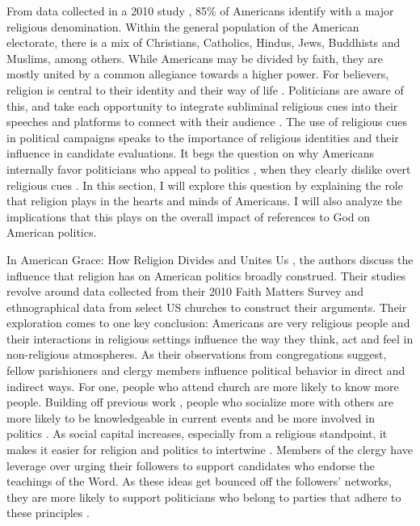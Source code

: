 \documentclass[letterpaper,man,natbib,noextraspace,12pt]{apa6}  %
\begin{document}
From data collected in a 2010 study \citep{putnam_american_2010}, 85\% of Americans identify with a major religious denomination. Within the general population of the American electorate, there is a mix of Christians, Catholics, Hindus, Jews, Buddhists and Muslims, among others. While Americans may be divided by faith, they are mostly united by a common allegiance towards a higher power. For believers, religion is central to their identity and their way of life \citep{wald_religion_2011}. Politicians are aware of this, and take each opportunity to integrate subliminal religious cues into their speeches and platforms to connect with their audience \citep{albertson_religious_2011, domke_god_2008}. The use of religious cues in political campaigns speaks to the importance of religious identities and their influence in candidate evaluations. It begs the question on why Americans internally favor politicians who appeal to politics \citep{albertson_religious_2011}, when they clearly dislike overt religious cues \citep{mclaughlin_cueing_2014}. In this section, I will explore this question by explaining the role that religion plays in the hearts and minds of Americans. I will also analyze the implications that this plays on the overall impact of references to God on American politics.

In American Grace: How Religion Divides and Unites Us \citep{putnam_american_2010}, the authors discuss the influence that religion has on American politics broadly construed. Their studies revolve around data collected from their 2010 Faith Matters Survey and ethnographical data from select US churches to construct their arguments. Their exploration comes to one key conclusion: Americans are very religious people and their interactions in religious settings influence the way they think, act and feel in non-religious atmospheres. As their observations from congregations suggest, fellow parishioners and clergy members influence political behavior in direct and indirect ways. For one, people who attend church are more likely to know more people. Building off previous work \citep{putnam_bowling_2001}, people who socialize more with others are more likely to be knowledgeable in current events and be more involved in politics \citep{huckfeldt2001social}. As social capital increases, especially from a religious standpoint, it makes it easier for religion and politics to intertwine \citep{putnam_american_2010}. Members of the clergy have leverage over urging their followers to support candidates who endorse the teachings of the Word. As these ideas get bounced off the followers’ networks, they are more likely to support politicians who belong to parties that adhere to these principles \citep{calfano_god_2009}.
\end{document}
